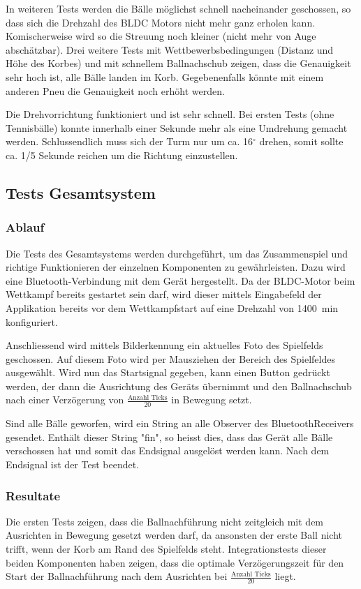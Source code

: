 \noindent
In weiteren Tests werden die Bälle möglichst schnell nacheinander geschossen, 
so dass sich die Drehzahl des BLDC Motors nicht mehr ganz erholen kann. 
Komischerweise wird so die Streuung noch kleiner (nicht mehr von Auge 
abschätzbar). Drei weitere Tests mit Wettbewerbsbedingungen (Distanz und Höhe 
des Korbes) und mit schnellem Ballnachschub zeigen, dass die Genauigkeit sehr 
hoch ist, alle Bälle landen im Korb. Gegebenenfalls könnte mit einem anderen 
Pneu die Genauigkeit noch erhöht werden.

\noindent
Die Drehvorrichtung funktioniert und ist sehr schnell. Bei ersten Tests (ohne 
Tennisbälle) konnte innerhalb einer Sekunde mehr als eine Umdrehung gemacht 
werden. Schlussendlich muss sich der Turm nur um ca. 16$^\circ$ drehen, somit 
sollte ca. 1/5 Sekunde reichen um die Richtung einzustellen.

\clearpage
\subsection{Tests Gesamtsystem}
\subsubsection{Ablauf}
Die Tests des Gesamtsystems werden durchgeführt, um das Zusammenspiel und 
richtige Funktionieren der einzelnen Komponenten zu gewährleisten. Dazu wird 
eine Bluetooth-Verbindung mit dem Gerät hergestellt. Da der BLDC-Motor beim 
Wettkampf bereits gestartet sein darf, wird dieser mittels Eingabefeld der 
Applikation bereits vor dem Wettkampfstart auf eine Drehzahl von 
1400\si{\per\minute} konfiguriert.

\noindent
Anschliessend wird mittels Bilderkennung ein aktuelles Foto des Spielfelds 
geschossen. Auf diesem Foto wird per Mausziehen der Bereich des Spielfeldes 
ausgewählt. Wird nun das Startsignal gegeben, kann einen Button gedrückt 
werden, der dann die Ausrichtung des Geräts übernimmt und den Ballnachschub 
nach einer Verzögerung von $\frac{\text{Anzahl Ticks}}{20}$ in Bewegung setzt.

\noindent
Sind alle Bälle geworfen, wird ein String an alle Observer des 
BluetoothReceivers gesendet. Enthält dieser String "fin", so heisst dies, dass 
das Gerät alle Bälle verschossen hat und somit das Endsignal ausgelöst werden 
kann. Nach dem Endsignal ist der Test beendet.

\subsubsection{Resultate}
\noindent
Die ersten Tests zeigen, dass die Ballnachführung nicht zeitgleich mit 
dem Ausrichten in Bewegung gesetzt werden darf, da ansonsten der erste Ball 
nicht trifft, wenn der Korb am Rand des Spielfelds steht. Integrationstests 
dieser beiden Komponenten haben zeigen, dass die optimale Verzögerungszeit 
für den Start der Ballnachführung nach dem Ausrichten bei $\frac{\text{Anzahl 
Ticks}}{20}$ liegt. 

